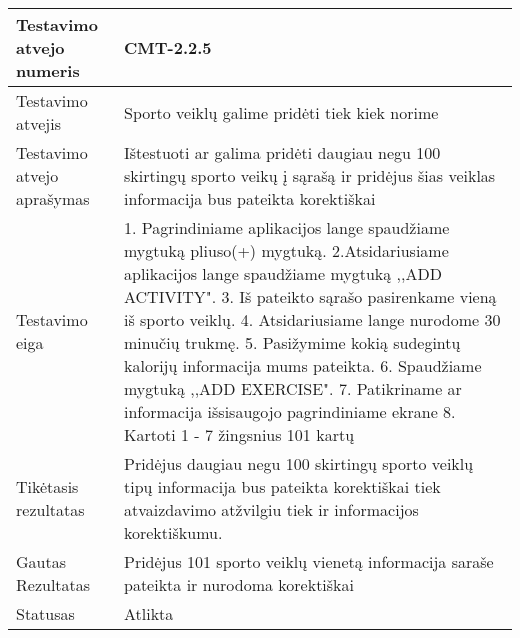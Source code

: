 \documentclass[oneside]{VUMIFPSkursinis}
\begin{document}
\begin{center}
    \begin{tabular}{ |p{5cm}|p{13cm}|}
    \hline
        Testavimo atvejo numeris & CMT-2.2.5  \\ \hline
        Testavimo atvejis & Sporto veiklų galime pridėti tiek kiek norime  \\ \hline
        Testavimo atvejo aprašymas & Ištestuoti ar galima pridėti daugiau negu 100 skirtingų sporto veikų į sąrašą ir pridėjus šias veiklas informacija bus pateikta korektiškai \\ \hline
        Testavimo eiga &  1. Pagrindiniame aplikacijos lange spaudžiame mygtuką pliuso(+) mygtuką. 
				2.Atsidariusiame aplikacijos lange spaudžiame mygtuką ,,ADD ACTIVITY". 
				3. Iš pateikto sąrašo pasirenkame vieną iš sporto veiklų. 
				4. Atsidariusiame lange nurodome 30 minučių trukmę.
				5. Pasižymime kokią sudegintų kalorijų informacija mums pateikta. 
				6. Spaudžiame mygtuką ,,ADD EXERCISE".
				7. Patikriname ar informacija išsisaugojo pagrindiniame ekrane
				8. Kartoti 1 - 7 žingsnius 101 kartų \\ \hline
        Tikėtasis rezultatas & Pridėjus daugiau negu 100 skirtingų sporto veiklų tipų informacija bus pateikta korektiškai tiek atvaizdavimo atžvilgiu tiek ir informacijos korektiškumu.\\ \hline
        Gautas Rezultatas & Pridėjus 101 sporto veiklų vienetą informacija saraše pateikta ir nurodoma korektiškai  \\ \hline
        Statusas & Atlikta  \\ \hline
    \hline
    \end{tabular}
\end{center}
\end{document}
